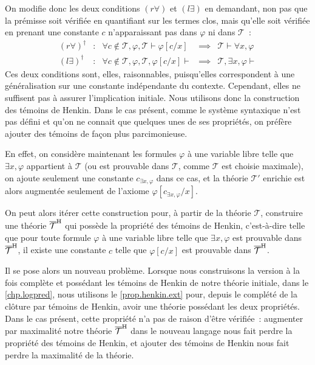 On modifie donc les deux conditions $(r\forall)$ et $(l\exists)$ en demandant,
non pas que la prémisse soit vérifiée en quantifiant sur les termes clos,
mais qu'elle soit vérifiée en prenant une constante $c$ n'apparaissant pas dans
$\varphi$ ni dans $\mathcal T$~:
\[\begin{array}{ccccc}
(r\forall)^\dagger & : & \forall c \notin \mathcal T, \varphi,
\mathcal T \vdash \varphi[c/x]
& \implies & \mathcal T \vdash \forall x, \varphi \\
(l\exists)^\dagger & : & \forall c \notin \mathcal T, \varphi,
\mathcal T, \varphi[c/x]\vdash
& \implies & \mathcal T, \exists x, \varphi \vdash
\end{array}\]
Ces deux conditions sont, elles, raisonnables, puisqu'elles correspondent à une
généralisation sur une constante indépendante du contexte. Cependant, elles ne
suffisent pas à assurer l'implication initiale. Nous utilisons donc la
construction des témoins de Henkin. Dans le cas présent, comme le système
syntaxique n'est pas défini et qu'on ne connait que quelques unes de ses
propriétés, on préfère ajouter des témoins de façon plus parcimonieuse.

En effet, on considère maintenant les formules $\varphi$ à une variable libre
telle que $\exists x, \varphi$ appartient à $\mathcal T$ (ou est prouvable dans
$\mathcal T$, comme $\mathcal T$ est choisie maximale), on ajoute seulement
une constante $c_{\exists x, \varphi}$ dans ce cas, et la théorie $\mathcal T'$
enrichie est alors augmentée seulement de l'axiome
$\varphi[c_{\exists x, \varphi}/x]$.

On peut alors itérer cette construction pour, à partir de la théorie
$\mathcal T$, construire une théorie $\overline{\mathcal T}^{\mathrm H}$ qui possède la
propriété des témoins de Henkin, c'est-à-dire telle que pour toute formule
$\varphi$ à une variable libre telle que $\exists x, \varphi$ est prouvable
dans $\overline{\mathcal T}^{\mathrm H}$, il existe une constante $c$ telle que
$\varphi[c/x]$ est prouvable dans $\overline{\mathcal T}^{\mathrm H}$.

Il se pose alors un nouveau problème. Lorsque nous construisons la version à
la fois complète et possédant les témoins de Henkin de notre théorie initiale,
dans le \cref{chp.logpred}, nous utilisons le \cref{prop.henkin.ext} pour,
depuis le complété de la clôture par témoins de Henkin, avoir une théorie
possédant les deux propriétés. Dans le cas présent, cette propriété n'a pas de
raison d'être vérifiée~: augmenter par maximalité notre théorie
$\overline{\mathcal T}^{\mathrm H}$ dans le nouveau langage nous fait perdre la propriété des
témoins de Henkin, et ajouter des témoins de Henkin nous fait perdre la
maximalité de la théorie.

